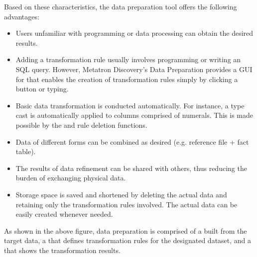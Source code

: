 \documentclass[letterpaper,10pt,english]{sphinxmanual}
\begin{document}
Based on these characteristics, the data preparation tool offers the following advantages:
\begin{itemize}
\item {} 
Users unfamiliar with programming or data processing can obtain the desired results.

\item {} 
Adding a transformation rule usually involves programming or writing an SQL query. However, Metatron Discovery’s Data Preparation provides a GUI for  that enables the creation of transformation rules simply by clicking a button or typing.

\item {} 
Basic data transformation is conducted automatically. For instance, a type cast is automatically applied to columns comprised of numerals. This is made possible by the  and rule deletion functions.

\item {} 
Data of different forms can be combined as desired (e.g. reference file + fact table).

\item {} 
The results of data refinement can be shared with others, thus reducing the burden of exchanging physical data.

\item {} 
Storage space is saved and  shortened by deleting the actual data and retaining only the transformation rules involved. The actual data can be easily created whenever needed.

\end{itemize}

\begin{quote}

\begin{figure}[H]
\centering

\noindent{}
\end{figure}
\end{quote}

As shown in the above figure, data preparation is comprised of a  built from the target data, a  that defines transformation rules for the designated dataset, and a  that shows the transformation results.
\end{document}
